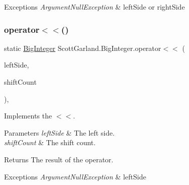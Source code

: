 \begin{DoxyExceptions}{Exceptions}
{\em Argument\+Null\+Exception} & left\+Side or right\+Side \\
\hline
\end{DoxyExceptions}
\mbox{\label{class_scott_garland_1_1_big_integer_af1e7806be3cb647088bf461b03052fc4}} 
\subsubsection{\texorpdfstring{operator$<$$<$()}{operator<<()}}
{\footnotesize\ttfamily static \hyperlink{class_scott_garland_1_1_big_integer}{Big\+Integer} Scott\+Garland.\+Big\+Integer.\+operator$<$$<$ (\begin{DoxyParamCaption}\item[{\hyperlink{class_scott_garland_1_1_big_integer}{Big\+Integer}}]{left\+Side,  }\item[{int}]{shift\+Count }\end{DoxyParamCaption})\hspace{0.3cm}{\ttfamily [inline]}, {\ttfamily [static]}}



Implements the $<$$<$. 


\begin{DoxyParams}{Parameters}
{\em left\+Side} & The left side.\\
\hline
{\em shift\+Count} & The shift count.\\
\hline
\end{DoxyParams}
\begin{DoxyReturn}{Returns}
The result of the operator.
\end{DoxyReturn}

\begin{DoxyExceptions}{Exceptions}
{\em Argument\+Null\+Exception} & left\+Side\\
\hline
\end{DoxyExceptions}
\mbox{\label{class_scott_garland_1_1_big_integer_aeed3d904b36d585e151be95cd12e798a}} 
